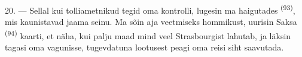20. --- Sellal kui tolliametnikud tegid oma kontrolli, lugesin ma haigutades
 \textsuperscript{(93)}, mis kaunistavad jaama seinu. Ma sõin aja
veetmiseks hommikust, uurisin Saksa  \textsuperscript{(94)} kaarti, et näha,
kui palju maad mind veel Strasbourgist lahutab, ja läksin tagasi oma vagunisse,
tugevdatuna lootusest peagi oma reisi siht saavutada.

\VUsaut{6.0mm}
\VUfilet{22mm}
